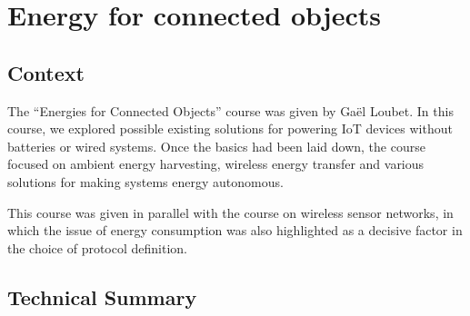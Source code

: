 \section{Energy for connected objects}
\subsection{Context}

\indent \indent The “Energies for Connected Objects” course was given by Gaël Loubet. In this course, we explored possible existing solutions for powering IoT devices without batteries or wired systems. Once the basics had been laid down, the course focused on ambient energy harvesting, wireless energy transfer and various solutions for making systems energy autonomous.
\vspace{0.25cm}

\noindent This course was given in parallel with the course on wireless sensor networks, in which the issue of energy consumption was also highlighted as a decisive factor in the choice of protocol definition.

\subsection{Technical Summary}

